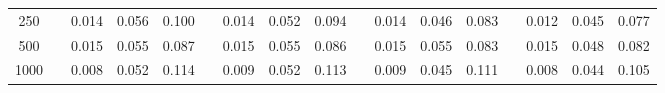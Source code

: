 % 
\begin{tabular}{ccccccccccccccccc}
  \hline
  \hline
250 &  & 0.014 & 0.056 & 0.100 &  & 0.014 & 0.052 & 0.094 &  & 0.014 & 0.046 & 0.083 &  & 0.012 & 0.045 & 0.077 \\ 
  500 &  & 0.015 & 0.055 & 0.087 &  & 0.015 & 0.055 & 0.086 &  & 0.015 & 0.055 & 0.083 &  & 0.015 & 0.048 & 0.082 \\ 
  1000 &  & 0.008 & 0.052 & 0.114 &  & 0.009 & 0.052 & 0.113 &  & 0.009 & 0.045 & 0.111 &  & 0.008 & 0.044 & 0.105 \\ 
   \hline
\end{tabular}
